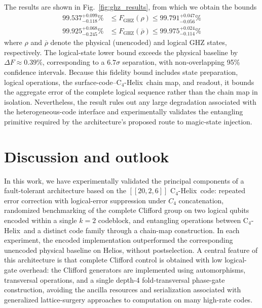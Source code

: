 \documentclass[aps,prx,reprint,showpacs,twocolumn,superscriptaddress,eqsecnum]{revtex4-2}
\newcommand{\chelix}{C$_4$-Helix}
\begin{document}
The results are shown in Fig.~\ref{fig:ghz_results}, from which we obtain the bounds
\begin{align}
    99.537^{+0.099}_{-0.118}\% &\le F_\text{GHZ}(\rho) \le 99.791^{+0.047}_{-0.056}\% \\
    99.925^{+0.068}_{-0.245}\% &\le F_\text{GHZ}(\overline{\rho}) \le 99.975^{+0.024}_{-0.114}\%\end{align}
where $\rho$ and $\overline{\rho}$ denote the physical (unencoded) and logical GHZ states, respectively. The logical-state lower bound exceeds the physical baseline by $\Delta F\approx0.39\%$, corresponding to a $6.7\sigma$ separation, with non-overlapping 95\% confidence intervals. Because this fidelity bound includes state preparation, logical operations, the surface-code--\chelix\ chain map, and readout, it bounds the aggregate error of the complete logical sequence rather than the chain map in isolation. Nevertheless, the result rules out any large degradation associated with the heterogeneous-code interface and experimentally validates the entangling primitive required by the architecture's proposed route to magic-state injection.


\section{Discussion and outlook}
\label{sec:discussion}

In this work, we have experimentally validated the principal components of a fault-tolerant architecture based on the $[[20,2,6]]$ \chelix\ code: repeated error correction with logical-error suppression under $C_4$ concatenation, randomized benchmarking of the complete Clifford group on two logical qubits encoded within a single $k=2$ codeblock, and entangling operations between \chelix\ and a distinct code family through a chain-map construction. In each experiment, the encoded implementation outperformed the corresponding unencoded physical baseline on Helios, without postselection. A central feature of this architecture is that complete Clifford control is obtained with low logical-gate overhead: the Clifford generators are implemented using automorphisms, transversal operations, and a single depth-4 fold-transversal phase-gate construction, avoiding the ancilla resources and serialization associated with generalized lattice-surgery approaches to computation on many high-rate codes.
\end{document}
